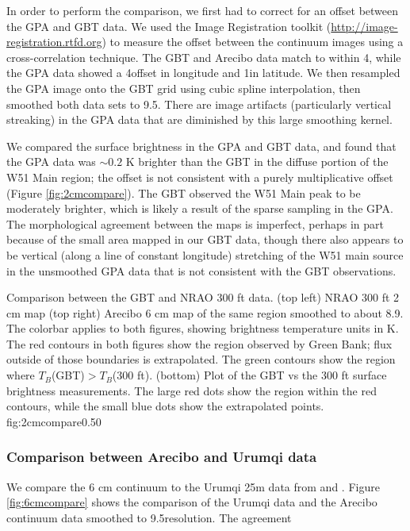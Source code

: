 In order to perform the comparison, we first had to correct for an offset
between the GPA and GBT data.  We used the Image Registration toolkit
(\url{http://image-registration.rtfd.org}) to measure the offset between the continuum
images using a cross-correlation technique.
The GBT and Arecibo data match to within 4\arcsec, while the GPA data showed
a 4\arcmin offset in longitude and 1\arcmin in latitude.  We then resampled
the GPA image onto the GBT grid using cubic spline interpolation, then smoothed
both data sets to 9.5\arcmin.  There are image artifacts (particularly
vertical streaking) in the GPA data that are diminished by this large
smoothing kernel.

We compared the surface brightness in the GPA and GBT data, and found that the
GPA data was $\sim0.2$ K brighter than the GBT in the diffuse portion of the
W51 Main region; the offset is not consistent with a purely multiplicative
offset (Figure \ref{fig:2cmcompare}).  The GBT observed the W51 Main peak to be
moderately brighter, which is likely a result of the sparse sampling in the
GPA.  The morphological agreement between the maps is imperfect, perhaps in
part because of the small area mapped in our GBT data, though there also
appears to be vertical (along a line of constant longitude) stretching of the
W51 main source in the unsmoothed GPA data that is not consistent with the GBT
observations.

{Comparison between the GBT and NRAO 300 ft \citep{Langston2000a} data.
(top left) NRAO 300 ft 2 cm map
(top right) Arecibo 6 cm map of the same region smoothed to about 8.9\arcmin. 
The colorbar applies to both figures,
showing brightness temperature units in K.  The red contours in both figures
show the region observed by Green Bank; flux outside of those boundaries is
extrapolated.  The green contours show the region where $T_B$(GBT)$>T_B$(300 ft).
(bottom) Plot of the GBT vs the 300 ft surface brightness measurements.
The large red dots show the region within the red contours, while the small
blue dots show the extrapolated points.  
}
{fig:2cmcompare}{0.5}{0}

\subsubsection{Comparison between Arecibo and Urumqi data}
We compare the 6 cm continuum to the Urumqi 25m data from \citet{Sun2007a} and
\citet{Sun2011a}.  Figure \ref{fig:6cmcompare} shows the comparison of the
Urumqi data and the Arecibo continuum data smoothed to 9.5\arcmin resolution.
The agreement 


